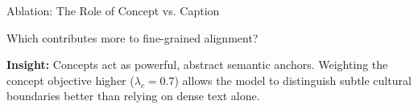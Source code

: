 \documentclass[aspectratio=169]{beamer}
\begin{document}
\begin{frame}{Ablation: The Role of Concept vs. Caption}

  Which contributes more to fine-grained alignment?
  
  \vspace{0.3cm}
  \begin{center}
  \end{center}

  \vspace{0.5cm}
  \textbf{Insight:} 
  Concepts act as powerful, abstract semantic anchors. Weighting the concept objective higher ($\lambda_c = 0.7$) allows the model to distinguish subtle cultural boundaries better than relying on dense text alone.
  
\end{frame}
\end{document}
